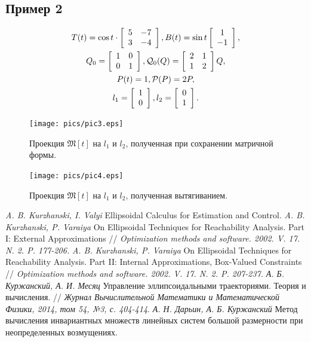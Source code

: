 \documentclass[12pt]{article}
\theoremstyle{rusdef}
\begin{document}
\subsection{Пример 2}
\begin{gather}
T(t) = \cos t \cdot \left[
\begin{array}{cccc}
5 & -7 \\
3 & -4
\end{array}
\right],
B(t) = \sin t \left[
\begin{array}{cccc}
1 \\
-1
\end{array}
\right], \notag \\
Q_0 = \left[
\begin{array}{cccc}
1 & 0 \\
0 & 1
\end{array}
\right],
\mathcal{Q}_0(Q) = \left[
\begin{array}{cccc}
2 & 1 \\
1 & 2
\end{array}
\right] Q, \notag \\
P(t) = 1,
\mathcal{P}(P) = 2P, \notag \\
l_1 = \left[
\begin{array}{cccc}
1 \\
0
\end{array}
\right],
l_2 = \left[
\begin{array}{cccc}
0 \\
1
\end{array}
\right]. \notag
\end{gather}

\begin{figure}[p]
	\centering
	\texttt{[image: pics/pic3.eps]}
	\caption{Проекция $\mathfrak{M}[t]$ на $l_1$ и $l_2$, полученная при сохранении матричной формы.}
	\label{pic3}
\end{figure}

\begin{figure}[p]
	\centering
	\texttt{[image: pics/pic4.eps]}
	\caption{Проекция $\mathfrak{M}[t]$ на $l_1$ и $l_2$, полученная вытягиванием.}
	\label{pic4}
\end{figure}

\newpage
\begin{thebibliography}{99}
         \textit{A. B. Kurzhanski, I. Valyi} Ellipsoidal Calculus for Estimation and Control.
         \textit{A. B. Kurzhanski, P. Varaiya} On Ellipsoidal Techniques for Reachability Analysis. Part I: External Approximations // \textit{Optimization methods and software. 2002. V. 17. N. 2. P. 177-206.}
         \textit{A. B. Kurzhanski, P. Varaiya} On Ellipsoidal Techniques for Reachability Analysis. Part II: Internal Approximations, Box-Valued Constraints // \textit{Optimization methods and software. 2002. V. 17. N. 2. P. 207-237.}
         \textit{А. Б. Куржанский, А. И. Месяц} Управление эллипсоидальными траекториями. Теория и вычисления. // \textit{Журнал Вычислительной Математики и Математической Физики, 2014, том 54, №3, с. 404-414}.
         \textit{А. Н. Дарьин, А. Б. Куржанский} Метод вычисления инвариантных множеств линейных систем большой размерности при неопределенных возмущениях.
\end{thebibliography}
\end{document}
